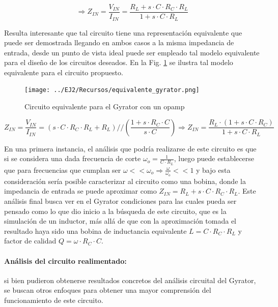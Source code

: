 \begin{equation}
    \Rightarrow Z_{IN} = \frac{V_{IN}}{I_{IN}} = \frac{R_L + s \cdot C \cdot R_C \cdot R_L}{1 + s \cdot C \cdot R_L}
\end{equation}

Resulta interesante que tal circuito tiene una representaci\'on equivalente que puede ser demostrada llegando en ambos casos a la misma impedancia de entrada,
desde un punto de vista ideal puede ser empleado tal modelo equivalente para el dise\~no de los circuitos deseados. En la Fig. \ref{fig:equivalente_gyrator} se ilustra tal modelo equivalente para el circuito propuesto.

\begin{figure}[H]
    \centering
    \texttt{[image: ../EJ2/Recursos/equivalente\_gyrator.png]}
    \caption{Circuito equivalente para el Gyrator con un opamp}
    \label{fig:equivalente_gyrator}
\end{figure}

\begin{equation}
    Z_{IN} = \frac{V_{IN}}{I_{IN}} = (s \cdot C \cdot R_C \cdot R_L + R_L) // (\frac{1 + s \cdot R_C \cdot C}{s \cdot C})
    \Rightarrow Z_{IN} = \frac{R_L \cdot (1 + s \cdot C \cdot R_C)}{1 + s \cdot C \cdot R_L}
\end{equation}

En una primera instancia, el an\'alisis que podr\'ia realizarse de este circuito es que si se considera una dada frecuencia de corte 
$\omega_o = \frac{1}{C \cdot R_L}$, luego puede establecerse que para frecuencias que cumplan ser $\omega << \omega_o \Rightarrow \frac{\omega}{\omega_o} << 1$ y bajo esta consideraci\'on
ser\'ia posible caracterizar al circuito como una bobina, donde la impedancia de entrada se puede aproximar como $Z_{IN} = R_L + s \cdot C \cdot R_C \cdot R_L$. Este an\'alisis final busca ver en el Gyrator condiciones para las cuales pueda ser pensado como lo que dio inicio a la b\'usqueda de este circuito, que es la simulaci\'on de un inductor, m\'as all\'a de que con la aproximaci\'on tomada
el resultado haya sido una bobina de inductancia equivalente $L = C \cdot R_C \cdot R_L$ y factor de calidad $Q = \omega \cdot R_C \cdot C$.

\paragraph*{An\'alisis del circuito realimentado:} si bien pudieron obtenerse resultados concretos del an\'alisis circuital del Gyrator, se buscan otros enfoques
para obtener una mayor comprensi\'on del funcionamiento de este circuito. 

